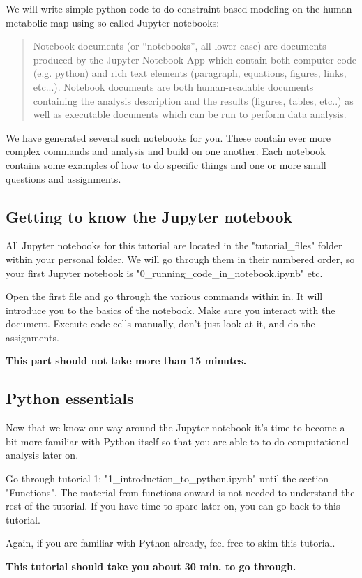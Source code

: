 \documentclass{article}
\begin{document}
We will write simple python code to do constraint-based modeling on the human metabolic map using so-called Jupyter notebooks:
\begin{quote}
Notebook documents (or “notebooks”, all lower case) are documents produced by the Jupyter Notebook App which contain both computer code (e.g. python) and rich text elements (paragraph, equations, figures, links, etc...). Notebook documents are both human-readable documents containing the analysis description and the results (figures, tables, etc..) as well as executable documents which can be run to perform data analysis.
\end{quote}

We have generated several such notebooks for you. These contain ever more complex commands and analysis and build on one another. Each notebook contains some examples of how to do specific things and one or more small questions and assignments.

\subsection*{Getting to know the Jupyter notebook}

\begin{tcolorbox}[width=\textwidth,colback={yellow},title={ASSIGNMENT},coltitle=white]

All Jupyter notebooks for this tutorial are located in the "tutorial\_files" folder within your personal folder.
We will go through them in their numbered order, so your first Jupyter notebook is "0\_running\_code\_in\_notebook.ipynb" etc.

Open the first file and go through the various commands within in. It will introduce you to the basics of the notebook. Make sure you interact with the document. Execute code cells manually, don't just look at it, and do the assignments.

\textbf{This part should not take more than 15 minutes.}
\end{tcolorbox}

\subsection*{Python essentials}
Now that we know our way around the Jupyter notebook it's time to become a bit more familiar with Python itself so that you are able to to do computational analysis later on.

\begin{tcolorbox}[width=\textwidth,colback={yellow},title={ASSIGNMENT},coltitle=white]

Go through tutorial 1: "1\_introduction\_to\_python.ipynb" until the section "Functions". The material from functions onward is not needed to understand the rest of the tutorial. If you have time to spare later on, you can go back to this tutorial.

Again, if you are familiar with Python already, feel free to skim this tutorial.

\textbf{This tutorial should take you about 30 min. to go through.}
\end{tcolorbox}
\end{document}
